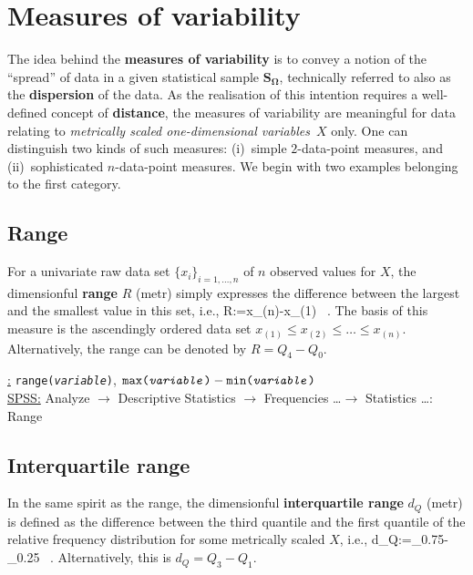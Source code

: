 \section[Measures of variability]{Measures of variability}
The idea behind the \textbf{measures of variability} is to convey a 
notion of the ``spread'' of data in a given statistical sample 
$\boldsymbol{S_{\Omega}}$, technically referred to also as the 
\textbf{dispersion} of the data. As the realisation of this
intention requires a well-defined concept of \textbf{distance}, 
the measures of variability are meaningful for data relating to 
\textit{metrically scaled one-dimensional variables}~$X$ only. One 
can distinguish two kinds of such measures: (i)~simple 
$2$-data-point measures, and (ii)~sophisticated $n$-data-point 
measures. We begin with two examples belonging to the first 
category.

\subsection[Range]{Range}
For a univariate raw data set $\{x_{i}\}_{i=1,\ldots,n}$ of $n$ 
observed values for $X$, the dimensionful \textbf{range} $R$ (metr) 
simply expresses the difference between the largest and the 
smallest value in this set, i.e.,
%
\be
{}
R:=x_{(n)}-x_{(1)} \ .
\ee
%
The basis of this measure is the ascendingly ordered data set 
$x_{(1)} \leq x_{(2)} \leq \ldots \leq x_{(n)}$. Alternatively, 
the range can be denoted by $R=Q_{4}-Q_{0}$.

\medskip
\noindent
\underline{\R:} \texttt{range(\textit{variable})},
$\texttt{max(\textit{variable})}
- \texttt{min(\textit{variable})}$ \\
\underline{SPSS:} Analyze $\rightarrow$ Descriptive Statistics
$\rightarrow$ Frequencies \ldots $\rightarrow$ Statistics
\ldots: Range

\subsection[Interquartile range]{Interquartile range}
In the same spirit as the range, the dimensionful
\textbf{interquartile range} $d_{Q}$ (metr) is defined as the 
difference between the third quantile and the first quantile of 
the relative frequency distribution for some metrically scaled
$X$, i.e.,
%
\be
d_{Q}:=_{0.75}-_{0.25} \ .
\ee
%
Alternatively, this is $d_{Q}=Q_{3}-Q_{1}$.

